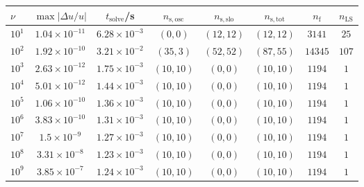 \begin{tabular}{l c c c c c c c}
\hline \hline 
 $\nu$  &  $\max|\Delta u/u|$  &  $t_{\mathrm{solve}}$/\si{\s} &  $n_{\mathrm{s,osc}}$  &  $n_{\mathrm{s,slo}}$  &  $n_{\mathrm{s,tot}}$  &  $n_{\mathrm{f}}$  &  $n_{\mathrm{LS}}$  \\ \hline
$10^1$  &  $1.04 \times 10^{-11}$  &  $6.28 \times 10^{-3}$  &  $(0, 0)$  &  $(12, 12)$  &  $(12, 12)$  &  $3141$  &  $25$\\ 
$10^2$  &  $1.92 \times 10^{-10}$  &  $3.21 \times 10^{-2}$  &  $(35, 3)$  &  $(52, 52)$  &  $(87, 55)$  &  $14345$  &  $107$\\ 
$10^3$  &  $2.63 \times 10^{-12}$  &  $1.75 \times 10^{-3}$  &  $(10, 10)$  &  $(0, 0)$  &  $(10, 10)$  &  $1194$  &  $1$\\ 
$10^4$  &  $5.01 \times 10^{-12}$  &  $1.44 \times 10^{-3}$  &  $(10, 10)$  &  $(0, 0)$  &  $(10, 10)$  &  $1194$  &  $1$\\ 
$10^5$  &  $1.06 \times 10^{-10}$  &  $1.36 \times 10^{-3}$  &  $(10, 10)$  &  $(0, 0)$  &  $(10, 10)$  &  $1194$  &  $1$\\ 
$10^6$  &  $3.83 \times 10^{-10}$  &  $1.31 \times 10^{-3}$  &  $(10, 10)$  &  $(0, 0)$  &  $(10, 10)$  &  $1194$  &  $1$\\ 
$10^7$  &  $1.5 \times 10^{-9}$  &  $1.27 \times 10^{-3}$  &  $(10, 10)$  &  $(0, 0)$  &  $(10, 10)$  &  $1194$  &  $1$\\ 
$10^8$  &  $3.31 \times 10^{-8}$  &  $1.23 \times 10^{-3}$  &  $(10, 10)$  &  $(0, 0)$  &  $(10, 10)$  &  $1194$  &  $1$\\ 
$10^9$  &  $3.85 \times 10^{-7}$  &  $1.24 \times 10^{-3}$  &  $(10, 10)$  &  $(0, 0)$  &  $(10, 10)$  &  $1194$  &  $1$\\ 
\hline \hline 
\end{tabular}
